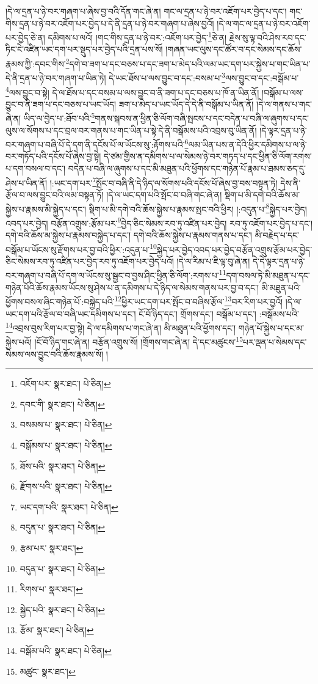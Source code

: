།དེ་ལ་དྲན་པ་ཉེ་བར་གཞག་པ་ཞེས་བྱ་བའི་དོན་གང་ཞེ་ན། གང་ལ་དྲན་པ་ཉེ་བར་འཇོག་པར་བྱེད་པ་དང་། གང་གིས་དྲན་པ་ཉེ་བར་འཇོག་པར་བྱེད་པ་དེ་ནི་དྲན་པ་ཉེ་བར་གཞག་པ་ཞེས་བྱའོ། །དེ་ལ་གང་ལ་དྲན་པ་ཉེ་བར་འཇོག་པར་བྱེད་ཅེ་ན། དམིགས་པ་ལའོ། །གང་གིས་དྲན་པ་ཉེ་བར་:འཇོག་པར་བྱེད་\footnote{འཇོག་པར་  སྣར་ཐང་།  པེ་ཅིན། }ཅེ་ན། རྗེས་སུ་ལྟ་བའི་ཤེས་རབ་དང་ཏིང་ངེ་འཛིན་ཡང་དག་པར་སྡུད་པར་བྱེད་པའི་དྲན་པས་སོ། །གཞན་ཡང་ལུས་དང་ཚོར་བ་དང་སེམས་དང་ཆོས་རྣམས་ཀྱི་:དབང་གིས་\footnote{དབང་གི་  སྣར་ཐང་།  པེ་ཅིན། }དགེ་བ་ཟག་པ་དང་བཅས་པ་དང་ཟག་པ་མེད་པའི་ལམ་ཡང་དག་པར་སྐྱེས་པ་གང་ཡིན་པ་དེ་ནི་དྲན་པ་ཉེ་བར་གཞག་པ་ཡིན་ཏེ། དེ་ཡང་ཐོས་པ་ལས་བྱུང་བ་དང་:བསམ་པ་\footnote{བསམས་པ་  སྣར་ཐང་།  པེ་ཅིན། }ལས་བྱུང་བ་དང་:བསྒོམ་པ་\footnote{བསྒོམས་པ་  སྣར་ཐང་།  པེ་ཅིན། }ལས་བྱུང་བ་སྟེ། དེ་ལ་ཐོས་པ་དང་བསམ་པ་ལས་བྱུང་བ་ནི་ཟག་པ་དང་བཅས་པ་ཁོ་ན་ཡིན་ནོ། །བསྒོམ་པ་ལས་བྱུང་བ་ནི་ཟག་པ་དང་བཅས་པ་ཡང་ཡོད། ཟག་པ་མེད་པ་ཡང་ཡོད་དེ་དེ་ནི་བསྒོམ་པ་ཡིན་ནོ། །དེ་ལ་གནས་པ་གང་ཞེ་ན། ཡིད་ལ་བྱེད་པ་:ཐོབ་པའི་\footnote{ཐོས་པའི་  སྣར་ཐང་།  པེ་ཅིན། }གནས་སྐབས་ན་ཕྱིན་ཅི་ལོག་བཞི་སྤངས་པ་དང་བདེན་པ་བཞི་ལ་ཞུགས་པ་དང་ལུས་ལ་སོགས་པ་དང་བྲལ་བར་གནས་པ་གང་ཡིན་པ་སྟེ་དེ་ནི་བསྒོམས་པའི་འབྲས་བུ་ཡིན་ནོ། །དེ་ལྟར་དྲན་པ་ཉེ་བར་གཞག་པ་བཞི་པོ་དེ་དག་ནི་དངོས་པོ་ལ་ཡོངས་སུ་:རྟོགས་པའི་\footnote{རྫོགས་པའི་  སྣར་ཐང་།  པེ་ཅིན། }ལམ་ཡིན་པས་ན་དེའི་ཕྱིར་དམིགས་པ་ལ་ཉེ་བར་གཏོད་པའི་དངོས་པོ་ཞེས་བྱ་སྟེ། དེ་ཙམ་གྱིས་ན་དམིགས་པ་ལ་སེམས་ཉེ་བར་གཏད་པ་དང་ཕྱིན་ཅི་ལོག་རགས་པ་དག་བསལ་བ་དང་། བདེན་པ་བཞི་ལ་ཞུགས་པ་དང་མི་མཐུན་པའི་ཕྱོགས་དང་གཉེན་པོ་རྣམ་པ་ཐམས་ཅད་དུ་ཤེས་པ་ཡིན་ནོ། །:ཡང་དག་པར་\footnote{ཡང་དག་པའི་  སྣར་ཐང་།  པེ་ཅིན། }སྤོང་བ་བཞི་ནི་དེ་ཉིད་ལ་སོགས་པའི་དངོས་པོ་ཞེས་བྱ་བས་བསྟན་ཏེ། དེས་ནི་རྩོལ་བ་ལས་བྱུང་བའི་ལམ་བསྟན་ཏོ། །དེ་ལ་ཡང་དག་པའི་སྤོང་བ་བཞི་གང་ཞེ་ན། སྡིག་པ་མི་དགེ་བའི་ཆོས་མ་སྐྱེས་པ་རྣམས་མི་སྐྱེད་པ་དང་། སྡིག་པ་མི་དགེ་བའི་ཆོས་སྐྱེས་པ་རྣམས་སྤང་བའི་ཕྱིར། །:འདུན་པ་\footnote{བདུན་པ་  སྣར་ཐང་།  པེ་ཅིན། }སྐྱེད་པར་བྱེད། འབད་པར་བྱེད། བརྩོན་འགྲུས་:རྩོམ་པར་\footnote{རྩམ་པར་  སྣར་ཐང་། }བྱེད་ཅིང་སེམས་རབ་ཏུ་འཛིན་པར་བྱེད། རབ་ཏུ་འཇོག་པར་བྱེད་པ་དང་། དགེ་བའི་ཆོས་མ་སྐྱེས་པ་རྣམས་བསྐྱེད་པ་དང་། དགེ་བའི་ཆོས་སྐྱེས་པ་རྣམས་གནས་པ་དང་། མི་བརྗེད་པ་དང་བསྒོམ་པ་ཡོངས་སུ་རྫོགས་པར་བྱ་བའི་ཕྱིར་:འདུན་པ་\footnote{བདུན་པ་  སྣར་ཐང་།  པེ་ཅིན། }སྐྱེད་པར་བྱེད་འབད་པར་བྱེད་བརྩོན་འགྲུས་རྩོམ་པར་བྱེད་ཅིང་སེམས་རབ་ཏུ་འཛིན་པར་བྱེད་རབ་ཏུ་འཇོག་པར་བྱེད་པའོ། །དེ་ལ་རིམ་པ་ཇི་ལྟ་བུ་ཞེ་ན། དེ་དེ་ལྟར་དྲན་པ་ཉེ་བར་གཞག་པ་བཞི་པོ་དག་ལ་ཡོངས་སུ་སྦྱང་བ་བྱས་ཤིང་ཕྱིན་ཅི་ལོག་:རགས་པ་\footnote{རིགས་པ་  སྣར་ཐང་། }དག་བསལ་ཏེ་མི་མཐུན་པ་དང་གཉེན་པོའི་ཆོས་རྣམས་ཡོངས་སུ་ཤེས་པ་ན་དམིགས་པ་དེ་ཉིད་ལ་སེམས་གནས་པར་བྱ་བ་དང་། མི་མཐུན་པའི་ཕྱོགས་བསལ་ཞིང་གཉེན་པོ་:བསྐྱེད་པའི་\footnote{སྐྱེད་པའི་  སྣར་ཐང་།  པེ་ཅིན། }ཕྱིར་ཡང་དག་པར་སྤོང་བ་བཞིས་རྩོལ་\footnote{རྩོམ་  སྣར་ཐང་།  པེ་ཅིན། }བར་རིག་པར་བྱའོ། །དེ་ལ་ཡང་དག་པའི་རྩོལ་བ་བཞི་ཡང་དམིགས་པ་དང་། ངོ་བོ་ཉིད་དང་། གྲོགས་དང་། བསྒོམ་པ་དང་། :བསྒོམས་པའི་\footnote{བསྒོམ་པའི་  སྣར་ཐང་།  པེ་ཅིན། }འབྲས་བུས་རིག་པར་བྱ་སྟེ། དེ་ལ་དམིགས་པ་གང་ཞེ་ན། མི་མཐུན་པའི་ཕྱོགས་དང་། གཉེན་པོ་སྐྱེས་པ་དང་མ་སྐྱེས་པའོ། །ངོ་བོ་ཉིད་གང་ཞེ་ན། བརྩོན་འགྲུས་སོ། །གྲོགས་གང་ཞེ་ན། དེ་དང་མཚུངས་\footnote{མཚུང་  སྣར་ཐང་། }པར་ལྡན་པ་སེམས་དང་སེམས་ལས་བྱུང་བའི་ཆོས་རྣམས་སོ། །
